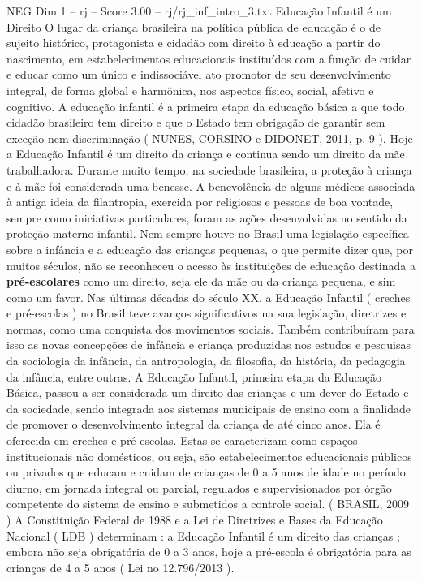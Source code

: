 \begin{textsample}{NEG Dim 1 – rj – Score 3.00 – rj/rj\_inf\_intro\_3.txt}  \label{ex:f1_neg_003}
Educação Infantil é um Direito O lugar da criança brasileira na política pública de educação é o de sujeito histórico, protagonista e cidadão com direito à educação a partir do nascimento, em estabelecimentos educacionais instituídos com a função de cuidar e educar como um único e indissociável ato promotor de seu desenvolvimento integral, de forma global e harmônica, nos aspectos físico, social, afetivo e cognitivo.
A educação infantil é a primeira etapa da educação básica a que todo cidadão brasileiro tem direito e que o Estado tem obrigação de garantir sem exceção nem discriminação ( NUNES, CORSINO e DIDONET, 2011, p. 9 ).
Hoje a Educação Infantil é um direito da criança e continua sendo um direito da mãe trabalhadora.
Durante muito tempo, na sociedade brasileira, a proteção à criança e à mãe foi considerada uma benesse.
A benevolência de alguns médicos associada à antiga ideia da filantropia, exercida por religiosos e pessoas de boa vontade, sempre como iniciativas particulares, foram as ações desenvolvidas no sentido da proteção materno-infantil.
Nem sempre houve no Brasil uma legislação específica sobre a infância e a educação das crianças pequenas, o que permite dizer que, por muitos séculos, não se reconheceu o acesso às instituições de educação destinada a \textbf{pré-escolares} como um direito, seja ele da mãe ou da criança pequena, e sim como um favor.
Nas últimas décadas do século XX, a Educação Infantil ( creches e pré-escolas ) no Brasil teve avanços significativos na sua legislação, diretrizes e normas, como uma conquista dos movimentos sociais.
Também contribuíram para isso as novas concepções de infância e criança produzidas nos estudos e pesquisas da sociologia da infância, da antropologia, da filosofia, da história, da pedagogia da infância, entre outras.
A Educação Infantil, primeira etapa da Educação Básica, passou a ser considerada um direito das crianças e um dever do Estado e da sociedade, sendo integrada aos sistemas municipais de ensino com a finalidade de promover o desenvolvimento integral da criança de até cinco anos.
Ela é oferecida em creches e pré-escolas.
Estas se caracterizam como espaços institucionais não domésticos, ou seja, são estabelecimentos educacionais públicos ou privados que educam e cuidam de crianças de 0 a 5 anos de idade no período diurno, em jornada integral ou parcial, regulados e supervisionados por órgão competente do sistema de ensino e submetidos a controle social. ( BRASIL, 2009 ) A Constituição Federal de 1988 e a Lei de Diretrizes e Bases da Educação Nacional ( LDB ) determinam : a Educação Infantil é um direito das crianças ; embora não seja obrigatória de 0 a 3 anos, hoje a pré-escola é obrigatória para as crianças de 4 a 5 anos ( Lei no 12.796/2013 ).

\end{textsample}
